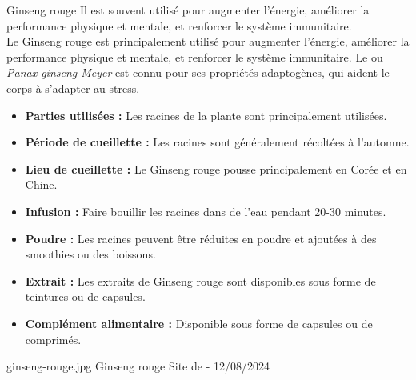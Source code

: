 \ficheidentiteplantelong
{Ginseng rouge}
{%
    Il est souvent utilisé pour augmenter l'énergie, améliorer la performance physique et mentale, et renforcer le système immunitaire.\\

	Le Ginseng rouge est principalement utilisé pour augmenter l'énergie, améliorer la performance physique et mentale, et 
    renforcer le système immunitaire.
}
{%
    Le  ou \textit{Panax ginseng Meyer} est connu pour ses propriétés adaptogènes, qui aident le corps à s'adapter au 
    stress.\\

}
{%
    \begin{itemize}[label = \bcplume]
		\item \textbf{Parties utilisées :} Les racines de la plante sont principalement utilisées.
		\item \textbf{Période de cueillette :} Les racines sont généralement récoltées à l'automne.
		\item \textbf{Lieu de cueillette :} Le Ginseng rouge pousse principalement en Corée et en Chine.
    \end{itemize}
}
{%
    \begin{itemize}
		\item \textbf{Infusion :} Faire bouillir les racines dans de l'eau pendant 20-30 minutes.
		\item \textbf{Poudre :} Les racines peuvent être réduites en poudre et ajoutées à des smoothies ou des boissons.
		\item \textbf{Extrait :} Les extraits de Ginseng rouge sont disponibles sous forme de teintures ou de capsules.
		\item \textbf{Complément alimentaire :} Disponible sous forme de capsules ou de comprimés.
    \end{itemize}
}
{%
    \begin{multicols}{2}


        \columnbreak


    \end{multicols}
}
{%
    ginseng-rouge.jpg
}
{%
    Ginseng rouge
}
{%
    Site de  - 12/08/2024
}

